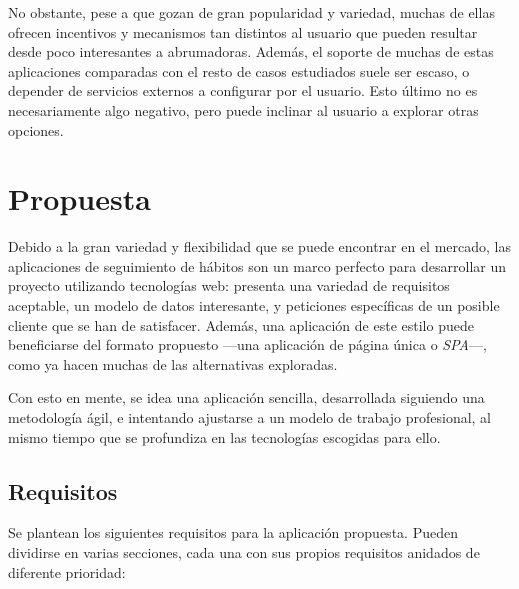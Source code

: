 \documentclass[10pt, a4paper]{aqademic}
\begin{document}
No obstante, pese a que gozan de gran popularidad y variedad, muchas de ellas ofrecen incentivos y mecanismos tan distintos al usuario que pueden resultar desde poco interesantes a abrumadoras. Además, el soporte de muchas de estas aplicaciones comparadas con el resto de casos estudiados suele ser escaso, o depender de servicios externos a configurar por el usuario. Esto último no es necesariamente algo negativo, pero puede inclinar al usuario a explorar otras opciones.


\section{Propuesta}

Debido a la gran variedad y flexibilidad que se puede encontrar en el mercado, las aplicaciones de seguimiento de hábitos son un marco perfecto para desarrollar un proyecto utilizando tecnologías web: presenta una variedad de requisitos aceptable, un modelo de datos interesante, y peticiones específicas de un posible cliente que se han de satisfacer. Además, una aplicación de este estilo puede beneficiarse del formato propuesto ---una aplicación de página única o \textit{SPA}---, como ya hacen muchas de las alternativas exploradas.

Con esto en mente, se idea una aplicación sencilla, desarrollada siguiendo una metodología ágil, e intentando ajustarse a un modelo de trabajo profesional, al mismo tiempo que se profundiza en las tecnologías escogidas para ello.


\subsection{Requisitos}

Se plantean los siguientes requisitos para la aplicación propuesta. Pueden dividirse en varias secciones, cada una con sus propios requisitos anidados de diferente prioridad:
\end{document}
